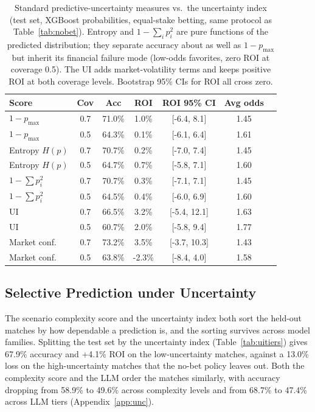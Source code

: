 \documentclass[10pt]{article}
\begin{document}
\begin{table}[htbp]
\centering
\caption{Standard predictive-uncertainty measures vs.\ the uncertainty index
(test set, XGBoost probabilities, equal-stake betting, same protocol as
Table~\ref{tab:nobet}). Entropy and $1-\sum_i p_i^2$ are pure functions of the
predicted distribution; they separate accuracy about as well as $1-p_{\max}$
but inherit its financial failure mode (low-odds favorites, zero ROI at
coverage 0.5). The UI adds market-volatility terms and keeps positive ROI at
both coverage levels. Bootstrap 95\% CIs for ROI all cross zero.}
\label{tab:stdunc}
\begin{tabular}{lcccccc}
\toprule
Score & Cov & Acc & ROI & ROI 95\% CI & Avg odds \\
\midrule
$1-p_{\max}$ & 0.7 & 71.0\% & 1.0\% & [-6.4, 8.1] & 1.45 \\
$1-p_{\max}$ & 0.5 & 64.3\% & 0.1\% & [-6.1, 6.4] & 1.61 \\
Entropy $H(p)$ & 0.7 & 70.7\% & 0.2\% & [-7.0, 7.4] & 1.45 \\
Entropy $H(p)$ & 0.5 & 64.7\% & 0.7\% & [-5.8, 7.1] & 1.60 \\
$1-\sum p_i^2$ & 0.7 & 70.7\% & 0.3\% & [-7.1, 7.1] & 1.45 \\
$1-\sum p_i^2$ & 0.5 & 64.5\% & 0.4\% & [-6.0, 6.9] & 1.60 \\
UI & 0.7 & 66.5\% & 3.2\% & [-5.4, 12.1] & 1.63 \\
UI & 0.5 & 60.7\% & 2.0\% & [-5.8, 9.4] & 1.77 \\
Market conf. & 0.7 & 73.2\% & 3.5\% & [-3.7, 10.3] & 1.43 \\
Market conf. & 0.5 & 63.8\% & -2.3\% & [-8.4, 4.0] & 1.58 \\
\bottomrule
\end{tabular}
\end{table}

\subsection{Selective Prediction under Uncertainty}
\label{sec:rq3}
The scenario complexity score and the uncertainty index both sort the held-out
matches by how dependable a prediction is, and the sorting survives across model
families. Splitting the test set by the uncertainty index
(Table~\ref{tab:uitiers}) gives 67.9\% accuracy and +4.1\% ROI on the
low-uncertainty matches, against a 13.0\% loss on the high-uncertainty matches
that the no-bet policy leaves out. Both the complexity score and the LLM order
the matches similarly, with accuracy dropping from 58.9\% to 49.6\% across
complexity levels and from 68.7\% to 47.4\% across LLM tiers
(Appendix~\ref{app:unc}).
\end{document}
